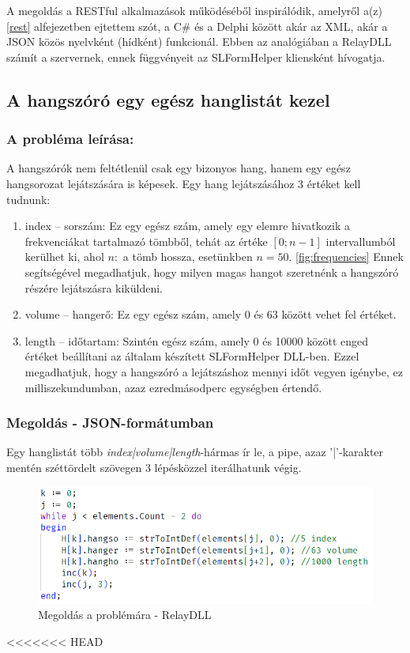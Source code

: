 \documentclass[tocnopagenum]{thesis-ekf}
\theoremstyle{definition}
\theoremstyle{remark}
\begin{document}
	A megoldás a RESTful alkalmazások működéséből inspirálódik, amelyről a(z) \ref{rest} alfejezetben ejtettem szót, a C\# és a Delphi között akár az XML, akár a JSON közös nyelvként (hídként) funkcionál. Ebben az analógiában a RelayDLL számít a szervernek, ennek függvényeit az SLFormHelper kliensként hívogatja.
	\subsection{A hangszóró egy egész hanglistát kezel}
	\subsubsection{A probléma leírása:} A hangszórók nem feltétlenül csak egy bizonyos hang, hanem egy egész hangsorozat lejátszására is képesek. Egy hang lejátszásához 3 értéket kell tudnunk:
	\begin{enumerate}
		\item index -- sorszám: Ez egy egész szám, amely egy elemre hivatkozik a frekvenciákat tartalmazó tömbből, tehát az értéke $[0;n-1]$ intervallumból kerülhet ki, ahol $n: $ a tömb hossza, esetünkben $n=50$. \ref{fig:frequencies} Ennek segítségével megadhatjuk, hogy milyen magas hangot szeretnénk a hangszóró részére lejátszásra kiküldeni.
		\item volume -- hangerő: Ez egy egész szám, amely 0 és 63 között vehet fel értéket.
		\item length -- időtartam: Szintén egész szám, amely 0 és 10000 között enged értéket beállítani az általam készített SLFormHelper DLL-ben. Ezzel megadhatjuk, hogy a hangszóró a lejátszáshoz mennyi időt vegyen igénybe, ez milliszekundumban, azaz ezredmásodperc egységben értendő.
	\end{enumerate}
	\subsubsection{Megoldás - JSON-formátumban}
	Egy hanglistát több \textit{index|volume|length}-hármas ír le, a pipe, azaz '|'-karakter mentén széttördelt szövegen 3 lépésközzel iterálhatunk végig.
	
	\begin{figure}[h!]
		\centering
		\includegraphics{speaker_solved}
		\caption{Megoldás a problémára - RelayDLL}
		\label{speaker_solved}
	\end{figure}
<<<<<<< HEAD
\end{document}
